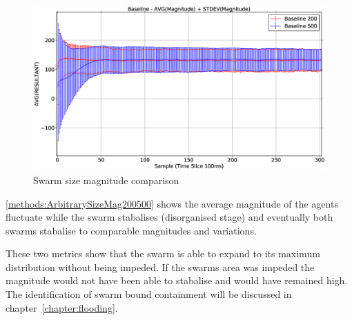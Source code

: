 \begin{figure}[H]
\begin{center}
\includegraphics[width=13cm]{CHAPTER-5/figures/ArbitrarySize200500MAG}
\end{center}
\caption{Swarm size magnitude comparison\label{methods:ArbitrarySizeMag200500}}
\end{figure}

\autoref{methods:ArbitrarySizeMag200500} shows the average magnitude of the agents fluctuate while the swarm stabalises (disorganised stage) and eventually both swarms stabalise to comparable magnitudes and variations.

These two metrics show that the swarm is able to expand to its maximum distribution without being impeded. If the swarms area was impeded the magnitude would not have been able to stabalise and would have remained high. The identification of swarm bound containment will be discussed in chapter~\ref{chapter:flooding}.



